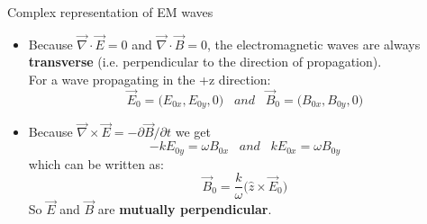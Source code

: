 %
%
%


%
%
%

\begin{frame}{Complex representation of EM waves}

\begin{itemize}
\item
  Because $\displaystyle \vec{\nabla} \cdot \vec{E} = 0$ and
  $\displaystyle \vec{\nabla} \cdot \vec{B} = 0$,
  the electromagnetic waves are always {\bf transverse}
  (i.e. perpendicular to the direction of propagation).\\
  \vspace{0.2cm}
  For a wave propagating in the +z direction:
  \begin{equation*}
    \vec{E}_0 = \Big( E_{0x}, E_{0y}, 0 \Big)   \;\;\; and \;\;\;
    \vec{B}_0 = \Big( B_{0x}, B_{0y}, 0 \Big)
  \end{equation*}

\item
  Because $\displaystyle \vec{\nabla} \times \vec{E} = - \partial \vec{B} / \partial t$
  we get
  \begin{equation*}
     -k E_{0y} = \omega B_{0x} \;\;\; and \;\;\;
      k E_{0x} = \omega B_{0y}
  \end{equation*}
  which can be written as:
  \begin{equation*}
       \vec{B}_{0} = \frac{k}{\omega} \Big( \hat{z} \times \vec{E}_0 \Big)
  \end{equation*}
  So $\vec{E}$ and $\vec{B}$ are {\bf mutually perpendicular}.

\end{itemize}

\end{frame}

%
%
%

